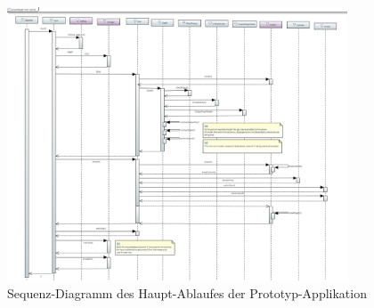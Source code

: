 \begin{figure}[H]
    \centering
    \includegraphics[width=0.9\textwidth]{img/prototype_sequence_diagram.png}
    \caption{Sequenz-Diagramm des Haupt-Ablaufes der
        Prototyp-Applikation\protect\footnotemark}\label{fig:prototype:sequence:diagram}
\end{figure}
